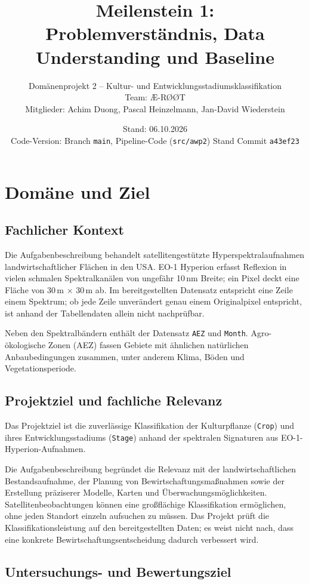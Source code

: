 \documentclass[11pt,a4paper]{article}
\title{Meilenstein 1:\\Problemverständnis, Data Understanding und Baseline}
\author{Domänenprojekt 2 -- Kultur- und Entwicklungsstadiumsklassifikation\\[0.5em]
Team: \AE-R\O\O T\\
Mitglieder: Achim Duong, Pascal Heinzelmann, Jan-David Wiederstein}
\date{Stand: 06.10.2026\\Code-Version: Branch \texttt{main}, Pipeline-Code (\texttt{src/awp2}) Stand Commit \texttt{a43ef23}}
\begin{document}
\maketitle

\section{Domäne und Ziel}

\subsection{Fachlicher Kontext}

Die Aufgabenbeschreibung behandelt satellitengestützte Hyperspektralaufnahmen landwirtschaftlicher
Flächen in den USA. EO-1 Hyperion erfasst Reflexion in vielen schmalen Spektralkanälen von
ungefähr 10\,nm Breite; ein Pixel deckt eine Fläche von 30\,m $\times$ 30\,m ab. Im bereitgestellten Datensatz entspricht eine Zeile einem
Spektrum; ob jede Zeile unverändert genau einem Originalpixel entspricht, ist anhand der
Tabellendaten allein nicht nachprüfbar.

Neben den Spektralbändern enthält der Datensatz \texttt{AEZ} und \texttt{Month}. Agro-ökologische Zonen (AEZ) fassen Gebiete mit ähnlichen natürlichen
Anbaubedingungen zusammen, unter anderem Klima, Böden und Vegetationsperiode.

\subsection{Projektziel und fachliche Relevanz}

Das Projektziel ist die zuverlässige Klassifikation der Kulturpflanze (\texttt{Crop}) und ihres
Entwicklungsstadiums (\texttt{Stage}) anhand der spektralen Signaturen aus EO-1-Hyperion-Aufnahmen.

Die Aufgabenbeschreibung begründet die Relevanz mit der landwirtschaftlichen Bestandsaufnahme,
der Planung von Bewirtschaftungsmaßnahmen sowie der Erstellung präziserer Modelle, Karten und
Überwachungsmöglichkeiten. Satellitenbeobachtungen können eine großflächige Klassifikation
ermöglichen, ohne jeden Standort einzeln aufsuchen zu müssen. Das Projekt prüft die
Klassifikationsleistung auf den bereitgestellten Daten; es weist nicht nach, dass eine konkrete
Bewirtschaftungsentscheidung dadurch verbessert wird.

\subsection{Untersuchungs- und Bewertungsziel}
\end{document}
